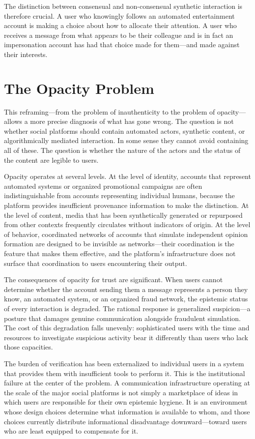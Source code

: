 \documentclass[12pt, a4paper]{article}
\begin{document}
The distinction between consensual and non-consensual synthetic interaction is therefore crucial. A user who knowingly follows an automated entertainment account is making a choice about how to allocate their attention. A user who receives a message from what appears to be their colleague and is in fact an impersonation account has had that choice made for them---and made against their interests.

\section{The Opacity Problem}

This reframing---from the problem of inauthenticity to the problem of opacity---allows a more precise diagnosis of what has gone wrong. The question is not whether social platforms should contain automated actors, synthetic content, or algorithmically mediated interaction. In some sense they cannot avoid containing all of these. The question is whether the nature of the actors and the status of the content are legible to users.

Opacity operates at several levels. At the level of identity, accounts that represent automated systems or organized promotional campaigns are often indistinguishable from accounts representing individual humans, because the platform provides insufficient provenance information to make the distinction. At the level of content, media that has been synthetically generated or repurposed from other contexts frequently circulates without indicators of origin. At the level of behavior, coordinated networks of accounts that simulate independent opinion formation are designed to be invisible as networks---their coordination is the feature that makes them effective, and the platform's infrastructure does not surface that coordination to users encountering their output.

The consequences of opacity for trust are significant. When users cannot determine whether the account sending them a message represents a person they know, an automated system, or an organized fraud network, the epistemic status of every interaction is degraded. The rational response is generalized suspicion---a posture that damages genuine communication alongside fraudulent simulation. The cost of this degradation falls unevenly: sophisticated users with the time and resources to investigate suspicious activity bear it differently than users who lack those capacities.

The burden of verification has been externalized to individual users in a system that provides them with insufficient tools to perform it. This is the institutional failure at the center of the problem. A communication infrastructure operating at the scale of the major social platforms is not simply a marketplace of ideas in which users are responsible for their own epistemic hygiene. It is an environment whose design choices determine what information is available to whom, and those choices currently distribute informational disadvantage downward---toward users who are least equipped to compensate for it.
\end{document}
